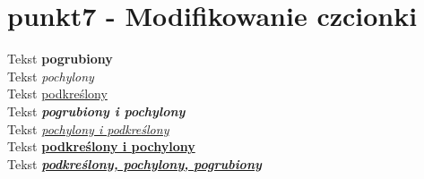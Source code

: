 \chapter{punkt7 - Modifikowanie czcionki}
Tekst \textbf{pogrubiony}\\
Tekst \textit{pochylony}\\
Tekst \underline{podkreślony}\\
Tekst \textbf{\textit{pogrubiony i pochylony}}\\
Tekst \textit{\underline{pochylony i podkreślony}}\\
Tekst \underline{\textbf{podkreślony i pochylony}}\\
Tekst \underline{\textit{\textbf{podkreślony, pochylony, pogrubiony}}}